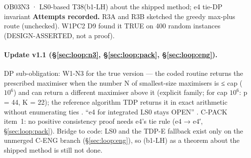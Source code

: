 \begin{card}{OB03}{N3 · LS0-based T38(b1-LH) about the shipped method; e4 tie-DP invariant}
\textbf{Attempts recorded.} R3A and R3B sketched the greedy max-plus route (unchecked). W1PC2 D9 found it TRUE on 400 random instances (DESIGN-ASSERTED, not a proof).
\end{card}

\paragraph{Update v1.1 (\S\ref{sec:loop:n3}, \S\ref{sec:loop:pack}, \S\ref{sec:loop:eng}).} DP sub-obligation: W1-N3  for the true version — the coded routine returns the prescribed maximiser when the number N of smallest-size maximisers is ≤ cap ($10^6$) and can return a different maximiser above it (explicit family; for cap $10^6$: p = 44, K = 22); the reference algorithm TDP returns it in exact arithmetic without enumerating ties . ``e4 for integrated LS0 stays OPEN'' . C-PACK item~1: no positive consistency proof needs e4's tie rule (e4 → e4′, \S\ref{sec:loop:pack}). Bridge to code: LS0 and the TDP-E fallback exist only on the unmerged C-ENG branch (\S\ref{sec:loop:eng}), so (b1-LH) as a theorem about the shipped method is still not done.

